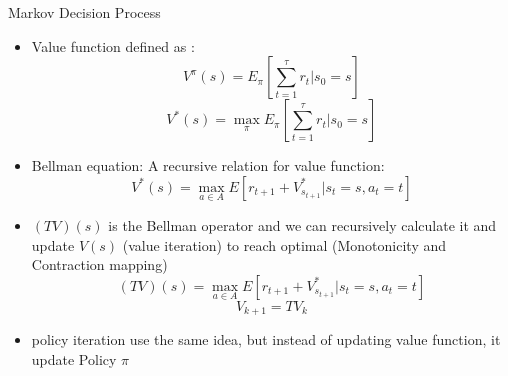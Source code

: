\begin{frame}{Markov Decision Process}
    \begin{itemize}
        \item Value function defined as :
            \begin{equation}
                V^{\pi}(s)=E_{\pi} [\sum_{t=1}^{\tau} r_{t}|s_{0}=s]
            \end{equation}
            \begin{equation}
                V^*(s)=\max\limits_{\pi} E_{\pi} [\sum_{t=1}^{\tau} r_{t}|s_{0}=s]
            \end{equation}
        \item Bellman equation: A recursive relation for value function:
            \begin{equation}
                V^*(s)=\max\limits_{a\in A} E [r_{t+1}+V^*_{s_{t+1}}|s_{t}=s,a_{t}=t]
            \end{equation}
        \item $(TV)(s)$ is the Bellman operator and we can recursively calculate it and update $V(s)$ (value iteration) to reach optimal (Monotonicity and Contraction mapping)
            \begin{equation}
                (TV)(s)=\max\limits_{a\in A} E [r_{t+1}+V^*_{s_{t+1}}|s_{t}=s,a_{t}=t]
            \end{equation}
            \begin{equation}
            V_{k+1}=TV_{k}
            \end{equation}
        \item policy iteration use the same idea, but instead of updating value function, it update Policy $\pi$

        
    \end{itemize}
\end{frame}


